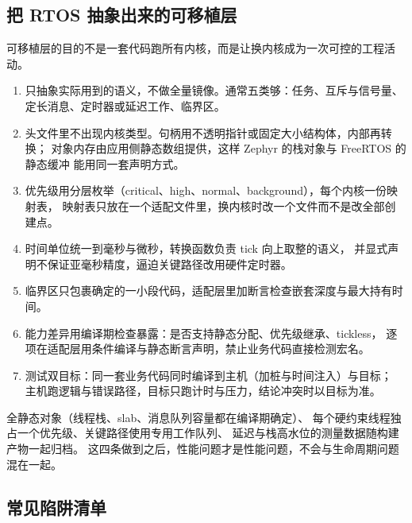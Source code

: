 \documentclass[12pt,a4paper,fontset=fandol]{ctexbook}
\begin{document}
\subsection{把 RTOS 抽象出来的可移植层}

可移植层的目的不是一套代码跑所有内核，而是让换内核成为一次可控的工程活动。

\begin{enumerate}
  \item 只抽象实际用到的语义，不做全量镜像。通常五类够：任务、互斥与信号量、
        定长消息、定时器或延迟工作、临界区。
  \item 头文件里不出现内核类型。句柄用不透明指针或固定大小结构体，内部再转换；
        对象内存由应用侧静态数组提供，这样 Zephyr 的栈对象与 FreeRTOS 的静态缓冲
        能用同一套声明方式。
  \item 优先级用分层枚举（critical、high、normal、background），每个内核一份映射表，
        映射表只放在一个适配文件里，换内核时改一个文件而不是改全部创建点。
  \item 时间单位统一到毫秒与微秒，转换函数负责 tick 向上取整的语义，
        并显式声明不保证亚毫秒精度，逼迫关键路径改用硬件定时器。
  \item 临界区只包裹确定的一小段代码，适配层里加断言检查嵌套深度与最大持有时间。
  \item 能力差异用编译期检查暴露：是否支持静态分配、优先级继承、tickless，
        逐项在适配层用条件编译与静态断言声明，禁止业务代码直接检测宏名。
  \item 测试双目标：同一套业务代码同时编译到主机（加桩与时间注入）与目标；
        主机跑逻辑与错误路径，目标只跑计时与压力，结论冲突时以目标为准。
\end{enumerate}

\begin{bestpractice}[title={实时项目里 Zephyr 的四条默认设置}]
全静态对象（线程栈、slab、消息队列容量都在编译期确定）、
每个硬约束线程独占一个优先级、关键路径使用专用工作队列、
延迟与栈高水位的测量数据随构建产物一起归档。
这四条做到之后，性能问题才是性能问题，不会与生命周期问题混在一起。
\end{bestpractice}

\subsection{常见陷阱清单}
\label{sec:ch07-pitfalls}
\end{document}
